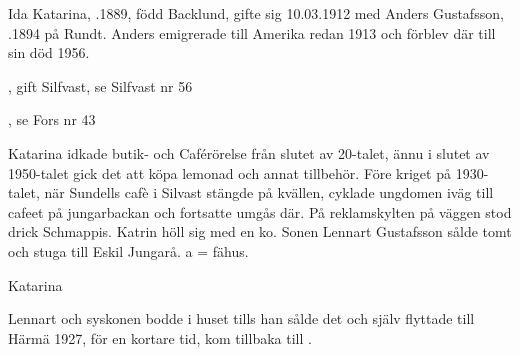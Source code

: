 %
Ida Katarina, .1889, född Backlund, gifte sig 10.03.1912 med Anders Gustafsson, .1894 på Rundt. Anders emigrerade till Amerika redan 1913 och förblev där till sin död 1956.
\begin{jhchildren}
  \item {}, gift Silfvast, se Silfvast nr 56
  \item {}, se Fors nr 43
\end{jhchildren}
Katarina idkade butik- och Caférörelse från slutet av 20-talet, ännu i slutet av 1950-talet gick det att köpa lemonad och annat tillbehör. Före kriget på 1930-talet, när Sundells cafè i Silvast stängde på kvällen, cyklade ungdomen iväg till cafeet på jungarbackan och fortsatte umgås där. På reklamskylten på väggen stod drick Schmappis. Katrin höll sig med en ko. Sonen Lennart Gustafsson sålde tomt och stuga till Eskil Jungarå. a  = fähus.

Katarina 


%
Lennart och syskonen bodde i huset tills han sålde det och själv flyttade till Härmä 1927, för en kortare tid, kom tillbaka till .\jhvspace{}


